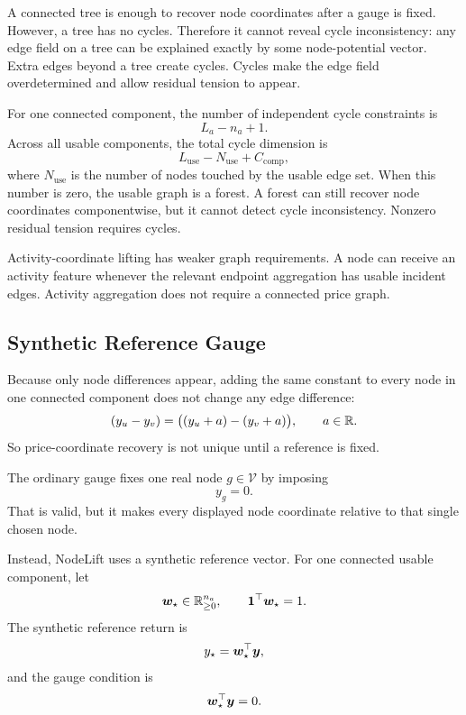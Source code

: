 A connected tree is enough to recover node coordinates after a gauge is fixed.
However, a tree has no cycles.  Therefore it cannot reveal cycle inconsistency:
any edge field on a tree can be explained exactly by some node-potential vector.
Extra edges beyond a tree create cycles.  Cycles make the edge field
overdetermined and allow residual tension to appear.

For one connected component, the number of independent cycle constraints is
\[
  L_a-n_a+1.
\]
Across all usable components, the total cycle dimension is
\[
  L_{\mathrm{use}}
  -
  N_{\mathrm{use}}
  +
  C_{\mathrm{comp}},
\]
where $N_{\mathrm{use}}$ is the number of nodes touched by the usable edge set.
When this number is zero, the usable graph is a forest.  A forest can still
recover node coordinates componentwise, but it cannot detect cycle
inconsistency.  Nonzero residual tension requires cycles.

Activity-coordinate lifting has weaker graph requirements.  A node can receive
an activity feature whenever the relevant endpoint aggregation has usable
incident edges.  Activity aggregation does not require a connected price graph.


\subsection{Synthetic Reference Gauge}
\label{subsec:synthetic-reference-gauge}

Because only node differences appear, adding the same constant to every node in
one connected component does not change any edge difference:
\[
  (y_u-y_v)
  =
  \bigl((y_u+a)-(y_v+a)\bigr),
  \qquad
  a\in\mathbb{R}.
\]
So price-coordinate recovery is not unique until a reference is fixed.

The ordinary gauge fixes one real node $g\in\mathcal{V}$ by imposing
\[
  y_g=0.
\]
That is valid, but it makes every displayed node coordinate relative to that
single chosen node.

Instead, NodeLift uses a synthetic reference vector.  For one connected usable
component, let
\[
  \bm{w}_{\star}
  \in
  \mathbb{R}_{\ge 0}^{n_a},
  \qquad
  \mathbf{1}^{\top}\bm{w}_{\star}=1.
\]
The synthetic reference return is
\[
  y_{\star}
  =
  \bm{w}_{\star}^{\top}\bm{y},
\]
and the gauge condition is
\[
  \bm{w}_{\star}^{\top}\bm{y}=0.
\]

